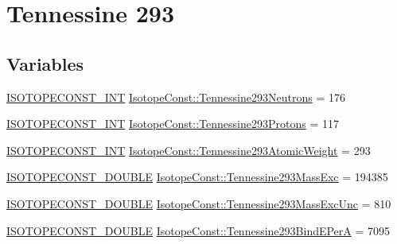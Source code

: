 \hypertarget{group___isotope_const-_tennessine-_ts293}{}\section{Tennessine 293}
\label{group___isotope_const-_tennessine-_ts293}
\subsection*{Variables}
\begin{DoxyCompactItemize}
\item 
\mbox{\hyperlink{group___isotope_const-_macros_ga5f18360b3e99483a35c32d789e62621c}{I\+S\+O\+T\+O\+P\+E\+C\+O\+N\+S\+T\+\_\+\+I\+NT}} \mbox{\hyperlink{group___isotope_const-_tennessine-_ts293_gadc671c6a20706d5b1cdd80bec119aab9}{Isotope\+Const\+::\+Tennessine293\+Neutrons}} = 176
\item 
\mbox{\hyperlink{group___isotope_const-_macros_ga5f18360b3e99483a35c32d789e62621c}{I\+S\+O\+T\+O\+P\+E\+C\+O\+N\+S\+T\+\_\+\+I\+NT}} \mbox{\hyperlink{group___isotope_const-_tennessine-_ts293_gae0bac8d37e417353757055672d5da3d3}{Isotope\+Const\+::\+Tennessine293\+Protons}} = 117
\item 
\mbox{\hyperlink{group___isotope_const-_macros_ga5f18360b3e99483a35c32d789e62621c}{I\+S\+O\+T\+O\+P\+E\+C\+O\+N\+S\+T\+\_\+\+I\+NT}} \mbox{\hyperlink{group___isotope_const-_tennessine-_ts293_ga242c2394fca78d913f42c3343ea989b5}{Isotope\+Const\+::\+Tennessine293\+Atomic\+Weight}} = 293
\item 
\mbox{\hyperlink{group___isotope_const-_macros_ga8f45a7272ce02c0b4c65c44636ed719a}{I\+S\+O\+T\+O\+P\+E\+C\+O\+N\+S\+T\+\_\+\+D\+O\+U\+B\+LE}} \mbox{\hyperlink{group___isotope_const-_tennessine-_ts293_ga176c372b982b5e45b0d5badc21badd40}{Isotope\+Const\+::\+Tennessine293\+Mass\+Exc}} = 194385
\item 
\mbox{\hyperlink{group___isotope_const-_macros_ga8f45a7272ce02c0b4c65c44636ed719a}{I\+S\+O\+T\+O\+P\+E\+C\+O\+N\+S\+T\+\_\+\+D\+O\+U\+B\+LE}} \mbox{\hyperlink{group___isotope_const-_tennessine-_ts293_ga3980a10c8f5f123423e9a3ece4e2a1b6}{Isotope\+Const\+::\+Tennessine293\+Mass\+Exc\+Unc}} = 810
\item 
\mbox{\hyperlink{group___isotope_const-_macros_ga8f45a7272ce02c0b4c65c44636ed719a}{I\+S\+O\+T\+O\+P\+E\+C\+O\+N\+S\+T\+\_\+\+D\+O\+U\+B\+LE}} \mbox{\hyperlink{group___isotope_const-_tennessine-_ts293_ga6e8110394bb18fa646bf49ec59828989}{Isotope\+Const\+::\+Tennessine293\+Bind\+E\+PerA}} = 7095
\item 

\end{DoxyCompactItemize}
